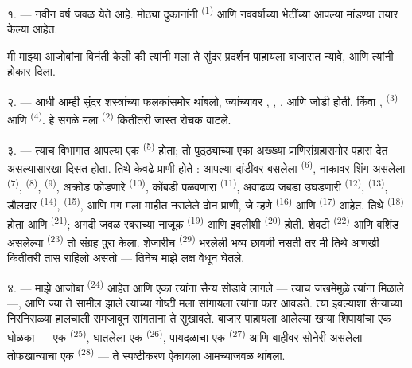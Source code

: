 १. --- नवीन वर्ष जवळ येते आहे. मोठ्या दुकानांनी  \textsuperscript{(1)}
आणि नववर्षाच्या भेटींच्या आपल्या मांडण्या तयार केल्या आहेत.

मी माझ्या आजोबांना विनंती केली की त्यांनी मला ते सुंदर प्रदर्शन पाहायला बाजारात न्यावे, आणि
त्यांनी होकार दिला.

२. --- आधी आम्ही सुंदर शस्त्रांच्या फलकांसमोर थांबलो, ज्यांच्यावर ,
, ,  आणि  जोडी होती,
किंवा ,  \textsuperscript{(3)} आणि 
\textsuperscript{(4)}. हे सगळे मला  \textsuperscript{(2)}
कितीतरी जास्त रोचक वाटले.

\VUsaut{3.0mm}
\VUsaut{2.6mm}

३. --- त्याच विभागात आपल्या  एक  \textsuperscript{(5)} होता;
तो पुठ्ठ्याच्या एका अख्ख्या प्राणिसंग्रहासमोर पहारा देत असल्यासारखा दिसत होता. तिथे केवढे
प्राणी होते : आपल्या दांडीवर बसलेला  \textsuperscript{(6)}, नाकावर शिंग असलेला
 \textsuperscript{(7)},  \textsuperscript{(8)}, 
\textsuperscript{(9)}, अक्रोड फोडणारे  \textsuperscript{(10)}, कोंबडी पळवणारा
 \textsuperscript{(11)}, अवाढव्य जबडा उघडणारी 
\textsuperscript{(12)},  \textsuperscript{(13)}, डौलदार 
\textsuperscript{(14)},  \textsuperscript{(15)}, आणि मग मला माहीत नसलेले दोन
प्राणी, जे म्हणे  \textsuperscript{(16)} आणि  \textsuperscript{(17)}
आहेत. तिथे  \textsuperscript{(18)} होता आणि 
\textsuperscript{(21)}; अगदी जवळ रबराच्या नाजूक  \textsuperscript{(19)} आणि
इवलीशी  \textsuperscript{(20)} होती. शेवटी 
\textsuperscript{(22)} आणि वशिंड असलेल्या  \textsuperscript{(23)} तो
संग्रह पुरा केला. शेजारीच  \textsuperscript{(29)} भरलेली भव्य छावणी
नसती तर मी तिथे आणखी कितीतरी तास राहिलो असतो — तिनेच माझे लक्ष वेधून घेतले.

\VUsaut{4.0mm}
\VUsaut{2.8mm}

४. --- माझे आजोबा  \textsuperscript{(24)} आहेत आणि एका 
त्यांना सैन्य सोडावे लागले — त्याच जखमेमुळे त्यांना  मिळाले —, आणि ज्या
 ते सामील झाले त्यांच्या गोष्टी मला सांगायला त्यांना फार आवडते. त्या इवल्याशा
सैन्याच्या निरनिराळ्या हालचाली समजावून सांगताना ते सुखावले. बाजार पाहायला आलेल्या खऱ्या
शिपायांचा एक घोळका — एक  \textsuperscript{(25)},  घातलेला
एक  \textsuperscript{(26)}, पायदळाचा एक 
\textsuperscript{(27)} आणि बाहीवर सोनेरी  असलेला तोफखान्याचा एक 
\textsuperscript{(28)} — ते स्पष्टीकरण ऐकायला आमच्याजवळ थांबला.

